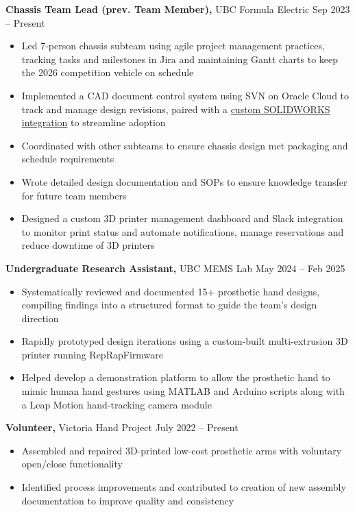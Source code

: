 \documentclass[11pt]{article}       %
\begin{document}
\textbf{Chassis Team Lead \textnormal{(prev. Team Member)},} {UBC Formula Electric} \hfill Sep 2023 -- Present \\
\vspace{-8.5pt}
\begin{itemize}
  \item Led 7-person chassis subteam using agile project management practices, tracking tasks and milestones in Jira and maintaining Gantt charts to keep the 2026 competition vehicle on schedule
  \item Implemented a CAD document control system using SVN on Oracle Cloud to track and manage design revisions, paired with a \href{https://www.danielrbenjamin.com/projects/cad-infra/}{custom SOLIDWORKS integration} to streamline adoption
  \item Coordinated with other subteams to ensure chassis design met packaging and schedule requirements
  \item Wrote detailed design documentation and SOPs to ensure knowledge transfer for future team members
  \item Designed a custom 3D printer management dashboard and Slack integration to monitor print status and automate notifications, manage reservations and reduce downtime of 3D printers
\end{itemize}

\textbf{Undergraduate Research Assistant,} {UBC MEMS Lab} \hfill May 2024 -- Feb 2025 \\
\vspace{-8.5pt}
\begin{itemize}
  \item Systematically reviewed and documented 15+ prosthetic hand designs, compiling findings into a structured format to guide the team's design direction
  \item Rapidly prototyped design iterations using a custom-built multi-extrusion 3D printer running RepRapFirmware
  \item Helped develop a demonstration platform to allow the prosthetic hand to mimic human hand gestures using MATLAB and Arduino scripts along with a Leap Motion hand-tracking camera module
\end{itemize}

\textbf{Volunteer,} {Victoria Hand Project} \hfill July 2022 -- Present \\
\vspace{-8.5pt}
\begin{itemize}
  \item Assembled and repaired 3D-printed low-cost prosthetic arms with voluntary open/close functionality
  \item Identified process improvements and contributed to creation of new assembly documentation to improve quality and consistency
\end{itemize}
\end{document}
